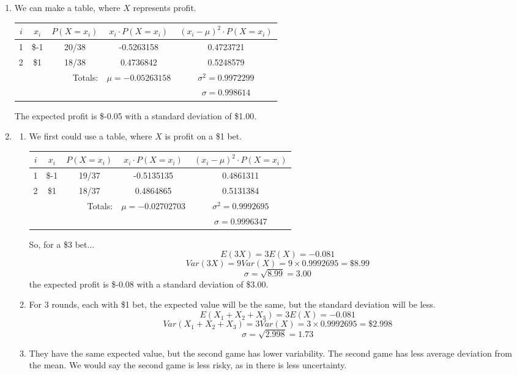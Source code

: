 \documentclass[12pt,letterpaper]{article}
\begin{document}
\begin{enumerate}
\item We can make a table, where $X$ represents profit.
\begin{center}
\renewcommand{\arraystretch}{1.3}
\begin{tabular}{|c|c|c|c|c|} \hline
$i$ & $x_i$ & $P(X=x_i)$ & $x_i \cdot P(X=x_i)$ & $(x_i-\mu)^2 \cdot P(X=x_i)$\\ \hline
1 & \$-1 & 20/38 & -0.5263158 & 0.4723721 \\
2 & \$1  & 18/38 & 0.4736842 & 0.5248579 \\\hline
\multicolumn{3}{r|}{Totals:} & $\mu=-0.05263158$ & $\sigma^2=0.9972299$ \\\cline{4-5}
\multicolumn{4}{r|}{}& $\sigma = 0.998614$\\\cline{5-5}
\end{tabular}
\end{center}
The expected profit is \$-0.05 with a standard deviation of \$1.00.

\item \begin{enumerate}
\item We first could use a table, where $X$ is profit on a \$1 bet.
\begin{center}
\renewcommand{\arraystretch}{1.3}
\begin{tabular}{|c|c|c|c|c|} \hline
$i$ & $x_i$ & $P(X=x_i)$ & $x_i \cdot P(X=x_i)$ & $(x_i-\mu)^2 \cdot P(X=x_i)$\\ \hline
1 & \$-1 & 19/37 & -0.5135135 & 0.4861311 \\
2 & \$1  & 18/37 & 0.4864865 & 0.5131384 \\\hline
\multicolumn{3}{r|}{Totals:} & $\mu=-0.02702703$ & $\sigma^2=0.9992695$ \\\cline{4-5}
\multicolumn{4}{r|}{}& $\sigma = 0.9996347$\\\cline{5-5}
\end{tabular}
\end{center}
So, for a \$3 bet...
$$E(3X) = 3E(X) = -0.081 $$
$$Var(3X) = 9Var(X) = 9\times 0.9992695 = \$8.99 $$
$$\sigma = \sqrt{8.99} = 3.00 $$
the expected profit is \$-0.08 with a standard deviation of \$3.00.
\item For 3 rounds, each with \$1 bet, the expected value will be the same, but the standard deviation will be less.
$$E(X_1 + X_2 + X_3) = 3E(X) = -0.081 $$
$$Var(X_1 + X_2 + X_3) = 3Var(X) = 3\times 0.9992695 = \$2.998 $$
$$\sigma = \sqrt{2.998} = 1.73 $$
\item They have the same expected value, but the second game has lower variability. The second game has less average deviation from the mean. We would say the second game is less risky, as in there is less uncertainty.
\end{enumerate}


\end{enumerate}
\end{document}
